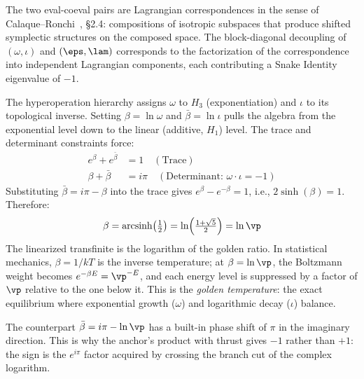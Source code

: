 \begin{remark}
The two eval-coeval pairs are Lagrangian correspondences in the sense of Calaque--Ronchi~\cite{calaque-ronchi}, \S2.4: compositions of isotropic subspaces that produce shifted symplectic structures on the composed space. The block-diagonal decoupling of $(\omega, \iota)$ and $(\eps, \lam)$ corresponds to the factorization of the correspondence into independent Lagrangian components, each contributing a Snake Identity eigenvalue of $-1$.
\end{remark}

\begin{remark}\label{rem:log-coords}
The hyperoperation hierarchy assigns $\omega$ to $H_3$ (exponentiation) and $\iota$ to its topological inverse. Setting $\beta = \ln\omega$ and $\bar\beta = \ln\iota$ pulls the algebra from the exponential level down to the linear (additive, $H_1$) level. The trace and determinant constraints force:
\begin{align}
  e^{\beta} + e^{\bar\beta} &= 1 \quad (\text{Trace}) \\
  \beta + \bar\beta &= i\pi \quad (\text{Determinant: } \omega \cdot \iota = -1)
\end{align}
Substituting $\bar\beta = i\pi - \beta$ into the trace gives $e^{\beta} - e^{-\beta} = 1$, i.e., $2\sinh(\beta) = 1$. Therefore:
$$\beta = \mathrm{arcsinh}\!\left(\tfrac{1}{2}\right) = \ln\!\left(\tfrac{1+\sqrt{5}}{2}\right) = \ln\vp$$
The linearized transfinite is the logarithm of the golden ratio. In statistical mechanics, $\beta = 1/kT$ is the inverse temperature; at $\beta = \ln\vp$, the Boltzmann weight becomes $e^{-\beta E} = \vp^{-E}$, and each energy level is suppressed by a factor of $\vp$ relative to the one below it. This is the \emph{golden temperature}: the exact equilibrium where exponential growth ($\omega$) and logarithmic decay ($\iota$) balance.

The counterpart $\bar\beta = i\pi - \ln\vp$ has a built-in phase shift of $\pi$ in the imaginary direction. This is why the anchor's product with thrust gives $-1$ rather than $+1$: the sign is the $e^{i\pi}$ factor acquired by crossing the branch cut of the complex logarithm.
\end{remark}

